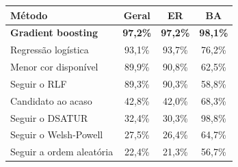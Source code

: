 \begin{tabular}{@{}lccc@{}}
\toprule
Método & Geral & ER & BA \\
\midrule
\textbf{Gradient boosting} & \textbf{97{,}2\%} & \textbf{97{,}2\%} & \textbf{98{,}1\%} \\
Regressão logística & 93{,}1\% & 93{,}7\% & 76{,}2\% \\
\midrule
Menor cor disponível & 89{,}9\% & 90{,}8\% & 62{,}5\% \\
Seguir o RLF & 89{,}3\% & 90{,}3\% & 58{,}8\% \\
Candidato ao acaso & 42{,}8\% & 42{,}0\% & 68{,}3\% \\
Seguir o DSATUR & 32{,}4\% & 30{,}3\% & 98{,}8\% \\
Seguir o Welsh-Powell & 27{,}5\% & 26{,}4\% & 64{,}7\% \\
Seguir a ordem aleatória & 22{,}4\% & 21{,}3\% & 56{,}7\% \\
\bottomrule
\end{tabular}
